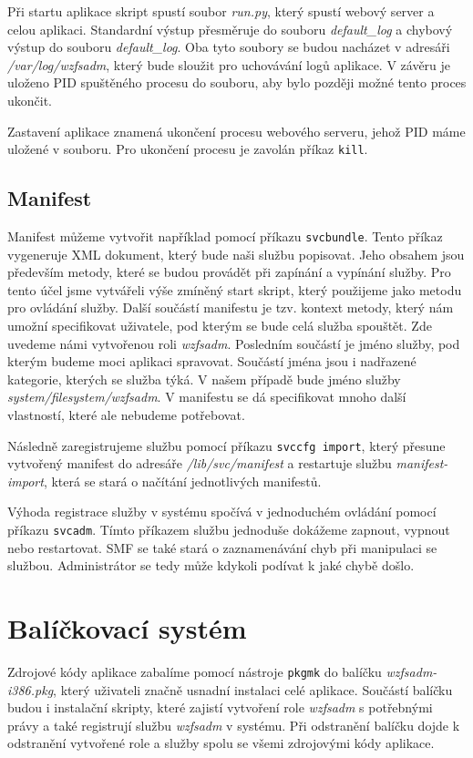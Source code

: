 Při startu aplikace skript spustí soubor \emph{run.py}, který spustí webový server a celou aplikaci. Standardní výstup přesměruje do souboru \emph{default\_log} a chybový výstup do souboru \emph{default\_log}. Oba tyto soubory se budou nacházet v adresáři \emph{/var/log/wzfsadm}, který bude sloužit pro uchovávání logů aplikace. V závěru je uloženo PID spuštěného procesu do souboru, aby bylo později možné tento proces ukončit.

Zastavení aplikace znamená ukončení procesu webového serveru, jehož PID máme uložené v souboru. Pro ukončení procesu je zavolán příkaz \verb|kill|.
\subsection{Manifest}
Manifest můžeme vytvořit například pomocí příkazu \verb|svcbundle|. Tento příkaz vygeneruje XML dokument, který bude naši službu popisovat. Jeho obsahem jsou především metody, které se budou provádět při zapínání a vypínání služby. Pro tento účel jsme vytvářeli výše zmíněný start skript, který použijeme jako metodu pro ovládání služby. Další součástí manifestu je tzv. kontext metody, který nám umožní specifikovat uživatele, pod kterým se bude celá služba spouštět. Zde uvedeme námi vytvořenou roli \emph{wzfsadm}. Posledním součástí je jméno služby, pod kterým budeme moci aplikaci spravovat. Součástí jména jsou i nadřazené kategorie, kterých se služba týká. V našem případě bude jméno služby \emph{system/\-filesystem/\-wzfsadm}. V manifestu se dá specifikovat mnoho další vlastností, které ale nebudeme potřebovat.

Následně zaregistrujeme službu pomocí příkazu \verb|svccfg import|, který přesune vytvořený manifest do adresáře \emph{/lib/\-svc/\-manifest} a restartuje službu \emph{manifest-import}, která se stará o načítání jednotlivých manifestů.

Výhoda registrace služby v systému spočívá v jednoduchém ovládání pomocí příkazu \verb|svcadm|. Tímto příkazem službu jednoduše dokážeme zapnout, vypnout nebo restartovat.
SMF se také stará o zaznamenávání chyb při manipulaci se službou. Administrátor se tedy může kdykoli podívat k jaké chybě došlo.
\section{Balíčkovací systém}
Zdrojové kódy aplikace zabalíme pomocí nástroje \verb|pkgmk| do balíčku \emph{wzfsadm-i386.pkg}, který uživateli značně usnadní instalaci celé aplikace. Součástí balíčku budou i instalační skripty, které zajistí vytvoření role \emph{wzfsadm} s potřebnými právy a také registrují službu \emph{wzfsadm} v systému. Při odstranění balíčku dojde k odstranění vytvořené role a služby spolu se všemi zdrojovými kódy aplikace.
